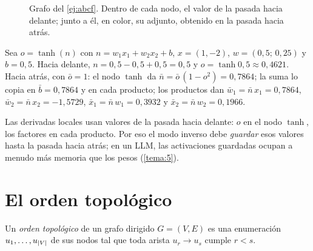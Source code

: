 \begin{figure}[h]
\centering
{}
\caption{Grafo del \cref{ej:abcf}. Dentro de cada nodo, el valor de la pasada hacia delante; junto a él, en color, su adjunto, obtenido en la pasada hacia atrás.}
\label{fig:abcf}
\end{figure}

\begin{ejemplo}\label{ej:neurona}
Sea $o=\tanh(n)$ con $n=w_1x_1+w_2x_2+b$, $x=(1,-2)$, $w=(0{,}5;\,0{,}25)$ y $b=0{,}5$. Hacia delante, $n=0{,}5-0{,}5+0{,}5=0{,}5$ y $o=\tanh 0{,}5\approx 0{,}4621$. Hacia atrás, con $\bar o=1$: el nodo $\tanh$ da $\bar n=\bar o\,(1-o^{2})=0{,}7864$; la suma lo copia en $\bar b=0{,}7864$ y en cada producto; los productos dan $\bar w_1=\bar n\,x_1=0{,}7864$, $\bar w_2=\bar n\,x_2=-1{,}5729$, $\bar x_1=\bar n\,w_1=0{,}3932$ y $\bar x_2=\bar n\,w_2=0{,}1966$.
\end{ejemplo}

Las derivadas locales usan valores de la pasada hacia delante: $o$ en el nodo $\tanh$, los factores en cada producto. Por eso el modo inverso debe \emph{guardar} esos valores hasta la pasada hacia atrás; en un LLM, las activaciones guardadas ocupan a menudo más memoria que los pesos (\cref{tema:5}).

\section{El orden topológico}

\begin{definicion}\label{def:topologico}
Un \emph{orden topológico} de un grafo dirigido $G=(V,E)$ es una enumeración $u_1,\dots,u_{\lvert V\rvert}$ de sus nodos tal que toda arista $u_r\to u_s$ cumple $r<s$.
\end{definicion}

